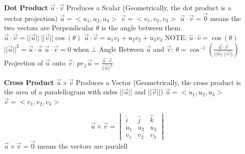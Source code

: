 \documentclass[10pt,landscape]{article}
\begin{document}
\begin{multicols*}{5}
\textbf{Dot Product}\newline
$ \vec{u} \cdot \vec{v} $\newline
Produces a Scalar \newline
(Geometrically, the dot product is a vector projection)\newline
$\vec{u} = < u_1, u_2, u_3 >$\newline
$\vec{v} = < v_1, v_2, v_3 >$\newline
$ \vec{u} \cdot \vec{v} = \vec{0} $ means the two vectors are Perpendicular
$ \theta $ is the angle between them.\newline
$\vec{u} \cdot \vec{v} = ||\vec{u}||\:||\vec{v}||\cos(\theta) $\newline
$\vec{u} \cdot \vec{v} = u_1v_1 + u_2v_2 + u_3v_3 $\newline
NOTE:\newline
$ \hat{u} \cdot \hat{v} = \cos(\theta) $\newline
$ ||\vec{u}||^2 = \vec{u} \cdot \vec{u} $\newline
$ \vec{u} \cdot \vec{v} = 0 $ when $ \bot $\newline
Angle Between $ \vec{u} $ and $ \vec{v} $:\newline
$ \theta = \cos^{-1}(\frac{\vec{u} \cdot \vec{v}}{||\vec{u}||\:||\vec{v}||}) $\newline
Projection of $ \vec{u} $ onto $ \vec{v} $:\newline
$ pr_{\vec{v}}\vec{u} = \frac{\vec{u} \cdot \vec{v}}{||\vec{u}||^2} $\newline

\textbf{Cross Product}\newline
$\vec{u} \times \vec{v}$\newline
Produces a Vector\newline
(Geometrically, the cross product is the area of a paralellogram with sides $ ||\vec{u}|| $ and $ ||\vec{v}|| $)\newline
$\vec{u} = < u_1, u_2, u_3 >$\newline
$\vec{v} = < v_1, v_2, v_3 >$\newline

\[
\vec{u} \times \vec{v} = 
\begin{vmatrix}
\hat{i} & \hat{j} & \hat{k} \\
u_1 & u_2 & u_3 \\
v_1 & v_2 & v_3
\end{vmatrix}
\]\newline 
$ \vec{u} \times \vec{v} = \vec{0} $ means the vectors are paralell\newline


\end{multicols*}
\end{document}
